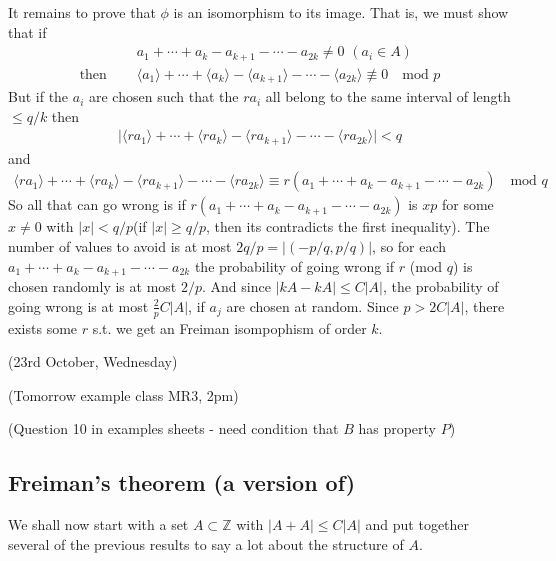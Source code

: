 \documentclass[12pt,a4paper]{report}
\newenvironment{proof}
{\begin{changemargin}{1cm}{0.5cm}
	}%
	{\end{changemargin}
}
\begin{document}
\begin{proof}
It remains to prove that $\phi$ is an isomorphism to its image. That is, we must show that if 
\begin{align*}
& a_1 + \cdots + a_k - a_{k+1} - \cdots - a_{2k} \neq 0 \,\, (a_i \in A)\\
\text{then } \quad & \langle a_1 \rangle + \cdots + \langle a_k \rangle - \langle a_{k+1} \rangle - \cdots - \langle a_{2k} \rangle \not\equiv 0 \quad \text{mod }p
\end{align*}
But if the $a_i$ are chosen such that the $ra_i$ all belong to the same interval of length $\leq q/k$ then
\begin{align*}
\Big|\langle ra_1 \rangle + \cdots + \langle ra_k \rangle - \langle ra_{k+1} \rangle - \cdots - \langle ra_{2k} \rangle \Big|  < q
\end{align*}
and
\begin{align*}
\langle ra_1 \rangle + \cdots + \langle ra_k \rangle - \langle ra_{k+1} \rangle - \cdots - \langle ra_{2k} \rangle \equiv r(a_1 + \cdots + a_k - a_{k+1} - \cdots -a_{2k}) \quad \text{mod } q
\end{align*}
So all that can go wrong is if $r(a_1 + \cdots + a_k - a_{k+1} - \cdots - a_{2k})$ is $xp$ for some $x\neq 0$ with $|x|<q/p$(if $|x|\geq q/p$, then its contradicts the first inequality). The number of values to avoid is at most $2q/p=|(-p/q,p/q)|$, so for each $a_1+ \cdots +a_k -a_{k+1} - \cdots - a_{2k}$ the probability of going wrong if $r$ (mod $q$) is chosen randomly is at most $2/p$. And since $|kA-kA|\leq C|A|$, the probability of going wrong is at most $\frac{2}{p} C|A|$, if $a_j$ are chosen at random. Since $p>2C|A|$, there exists some $r$ s.t. we get an Freiman isompophism of order $k$.

\eop
\end{proof}
\s

\newday

(23rd October, Wednesday)
\s

(Tomorrow example class MR3, 2pm)

(Question 10 in examples sheets - need condition that $B$ has property $P$)
\s

\subsection*{Freiman's theorem (a version of)}
\s

We shall now start with a set $A\subset \mathbb{Z}$ with $|A+A| \leq C|A|$ and put together several of the previous results to say a lot about the structure of $A$. 
\end{document}
